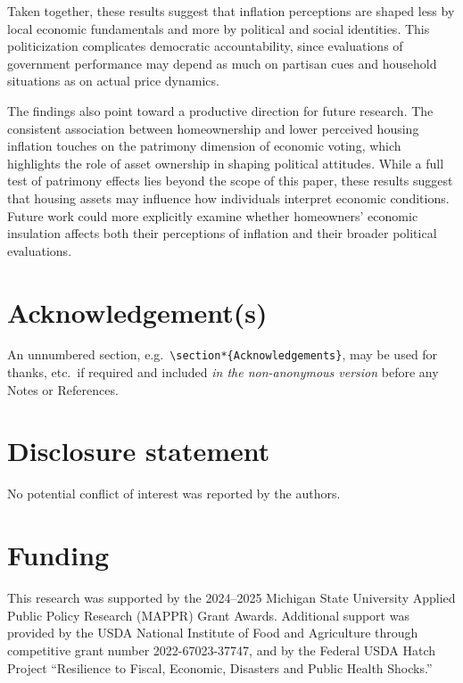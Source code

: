\documentclass[]{interact}
\theoremstyle{plain}%
\theoremstyle{definition}
\theoremstyle{remark}
\begin{document}
Taken together, these results suggest that inflation perceptions are shaped less by local economic fundamentals and more by political and social identities. This politicization complicates democratic accountability, since evaluations of government performance may depend as much on partisan cues and household situations as on actual price dynamics.

The findings also point toward a productive direction for future research. The consistent association between homeownership and lower perceived housing inflation touches on the patrimony dimension of economic voting, which highlights the role of asset ownership in shaping political attitudes. While a full test of patrimony effects lies beyond the scope of this paper, these results suggest that housing assets may influence how individuals interpret economic conditions. Future work could more explicitly examine whether homeowners’ economic insulation affects both their perceptions of inflation and their broader political evaluations.

\section*{Acknowledgement(s)}

An unnumbered section, e.g.\ \verb"\section*{Acknowledgements}", may be used for thanks, etc.\ if required and included \emph{in the non-anonymous version} before any Notes or References.


\section*{Disclosure statement}

No potential conflict of interest was reported by the authors.


\section*{Funding}

This research was supported by the 2024–2025 Michigan State University Applied Public Policy Research (MAPPR) Grant Awards. Additional support was provided by the USDA National Institute of Food and Agriculture through competitive grant number 2022-67023-37747, and by the Federal USDA Hatch Project “Resilience to Fiscal, Economic, Disasters and Public Health Shocks.”
\end{document}
